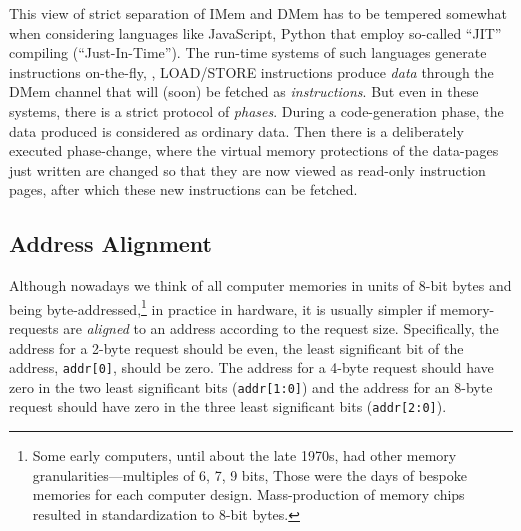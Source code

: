 
This view of strict separation of IMem and DMem has to be tempered
somewhat when considering languages like JavaScript, Python {\etc}
that employ so-called ``JIT'' compiling (``Just-In-Time'').  The
run-time systems of such languages generate instructions on-the-fly,
{\ie}, LOAD/STORE instructions produce \emph{data} through the DMem
channel that will (soon) be fetched as \emph{instructions}.  But even
in these systems, there is a strict protocol of \emph{phases}.  During
a code-generation phase, the data produced is considered as ordinary
data.  Then there is a deliberately executed phase-change, where the
virtual memory protections of the data-pages just written are changed
so that they are now viewed as read-only instruction pages, after
which these new instructions can be fetched.


\subsection{Address Alignment}


Although nowadays we think of all computer memories in units of 8-bit
bytes and being byte-addressed,\footnote{Some early computers, until
about the late 1970s, had other memory granularities---multiples of 6,
7, 9 bits, {\etc} Those were the days of bespoke memories for each
computer design.  Mass-production of memory chips resulted in
standardization to 8-bit bytes.} in practice in hardware, it is
usually simpler if memory-requests are \emph{aligned} to an address
according to the request size.  Specifically, the address for a 2-byte
request should be even, {\ie} the least significant bit of the
address, \verb|addr[0]|, should be zero.  The address for a 4-byte
request should have zero in the two least significant bits
(\verb|addr[1:0]|) and the address for an 8-byte request should have
zero in the three least significant bits (\verb|addr[2:0]|).

